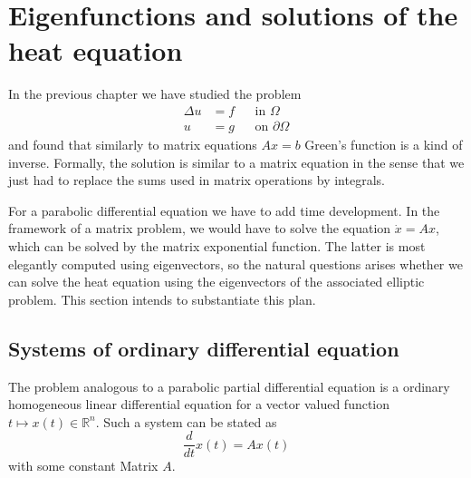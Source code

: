 %
%
%
\section{Eigenfunctions and solutions of the heat equation}
In the previous chapter we have studied the problem
\[
\begin{aligned}
\Delta u&=f&&\text{in $\Omega$}\\
u&=g&&\text{on $\partial\Omega$}
\end{aligned}
\]
and found that similarly to matrix equations $Ax=b$ Green's function is a kind
of inverse.
Formally, the solution is similar to a matrix equation in the sense
that we just had to replace the sums used in matrix operations by
integrals.

For a parabolic differential equation we have to add time development.
In the framework of a matrix problem, we would have to solve the
equation $\dot x = Ax$, which can be solved by the matrix
exponential function.
The latter is most elegantly computed using eigenvectors, so the
natural questions arises whether we can solve the heat equation
using the eigenvectors of the associated elliptic problem.
This section intends to substantiate this plan.

\subsection{Systems of ordinary differential equation}
The problem analogous to a parabolic partial differential equation
is a ordinary homogeneous linear differential equation for a vector valued
function $t\mapsto x(t)\in\mathbb R^n$.
Such a system can be stated as
\[
\frac{d}{dt}x(t)=Ax(t)
\]
with some constant Matrix $A$.

